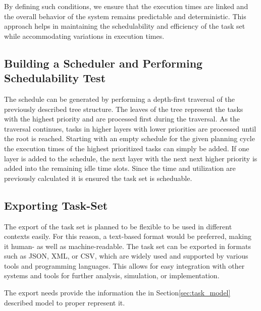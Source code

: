 By defining such conditions, we ensure that the execution times are linked and the overall behavior of the system remains predictable and deterministic. 
This approach helps in maintaining the schedulability and efficiency of the task set while accommodating variations in execution times.


\subsection{Building a Scheduler and Performing Schedulability Test}\label{sec:concept_scheduler}
The schedule can be generated by performing a depth-first traversal of the previously described tree structure.
The leaves of the tree represent the tasks with the highest priority and are processed first during the traversal.
As the traversal continues, tasks in higher layers with lower priorities are processed until the root is reached.
Starting with an empty schedule for the given planning cycle the execution times of the highest prioritized tasks can simply be added.
If one layer is added to the schedule, the next layer with the next next higher priority is added into the remaining idle time slots.
Since the time and utilization are previously calculated it is ensured the task set is scheduable.




\subsection{Exporting Task-Set}\label{sec:exporting_task_set}
The export of the task set is planned to be flexible to be used in different contexts easily.
For this reason, a text-based format would be preferred, making it human- as well as machine-readable.
The task set can be exported in formats such as JSON, XML, or CSV, which are widely used and supported by various tools and programming languages.
This allows for easy integration with other systems and tools for further analysis, simulation, or implementation.

The export needs provide the information the in Section\ref{sec:task_model} described model to proper represent it.



